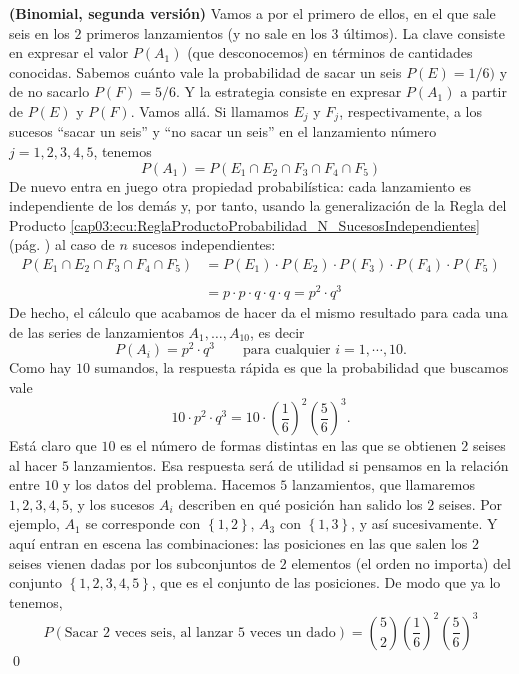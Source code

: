 \begin{Ejemplo}{\bf (Binomial, segunda versión)}
        Vamos a por el primero de ellos, en el que sale seis en los $2$  primeros lanzamientos (y no sale en los $3$ \'ultimos). La clave consiste en expresar el valor $P(A_1)$ (que desconocemos) en términos de cantidades conocidas. Sabemos cuánto vale la probabilidad de sacar un seis $P(E)=1/6)$ y de no sacarlo $P(F)=5/6$. Y la estrategia consiste en expresar $P(A_1)$ a partir de $P(E)$ y $P(F)$. Vamos allá. Si llamamos $E_j$ y $F_j$, respectivamente, a los sucesos ``sacar un seis'' y ``no sacar un seis''  en el lanzamiento n\'umero $j=1,2,3,4,5$, tenemos
          	\[P(A_1)=P(E_1\cap E_2 \cap F_3\cap F_4\cap F_5)\]
        De nuevo entra en juego otra propiedad probabilística: cada lanzamiento es independiente de los dem\'as y, por tanto, usando la generalización de la Regla del Producto \ref{cap03:ecu:ReglaProductoProbabilidad_N_SucesosIndependientes} (pág. \pageref{cap03:ecu:ReglaProductoProbabilidad_N_SucesosIndependientes}) al caso de $n$ sucesos independientes:
          	\[\begin{array}{rl}
          	P(E_1\cap E_2 \cap F_3\cap F_4\cap F_5)& =P(E_1)\cdot P( E_2 )\cdot P( F_3)\cdot P( F_4)
          	\cdot P( F_5) \\
          	& \\
          	& =p\cdot p \cdot q \cdot q \cdot q = p^2\cdot q^3
          	\end{array}\]
        De hecho, el c\'alculo que acabamos de hacer da el mismo resultado para cada una           	de las series de lanzamientos $A_1,\ldots,A_{10}$, es decir
          		\[P(A_i)=p^2\cdot q^3 \qquad \text{para cualquier }i=1,\cdots,10. \]
        Como hay $10$ sumandos, la respuesta r\'apida es que la probabilidad que buscamos vale
          		\[10\cdot p^2\cdot q^3=10\cdot\left( \dfrac{1}{6}\right)^2\left(\dfrac{5}{6}\right)^3. \]	
          	Est\'a claro que $10$ es el n\'umero de formas distintas en las que se obtienen $2$ seises
          	al hacer $5$ lanzamientos.
          	Esa respuesta ser\'a de utilidad si pensamos en la relaci\'on entre $10$
          	y los datos del problema. Hacemos $5$ lanzamientos, que llamaremos $1,2,3,4,5$,
          	y los sucesos $A_i$ 	describen en qu\'e posici\'on han salido los $2$ seises.
          	Por ejemplo, $A_1$ se corresponde con $\left\{1,2\right\}$, $A_3$ con $\left\{1,3\right\}$,
          	y as\'i sucesivamente. Y aqu\'i entran en escena las combinaciones:
          	las posiciones en las que salen los $2$ seises vienen dadas por los
          	subconjuntos de $2$ elementos (el orden no importa) del conjunto
          	 $\left\{1,2,3,4,5\right\}$, que es el conjunto 	de las posiciones.
          	De modo que ya lo tenemos,
          		\[P(\text{Sacar $2$ veces seis, al lanzar $5$ veces un dado})=
          		\binom{5}{2}\left( \dfrac{1}{6}\right)^2\left(\dfrac{5}{6}\right)^3\]
          \qed
\end{Ejemplo}
